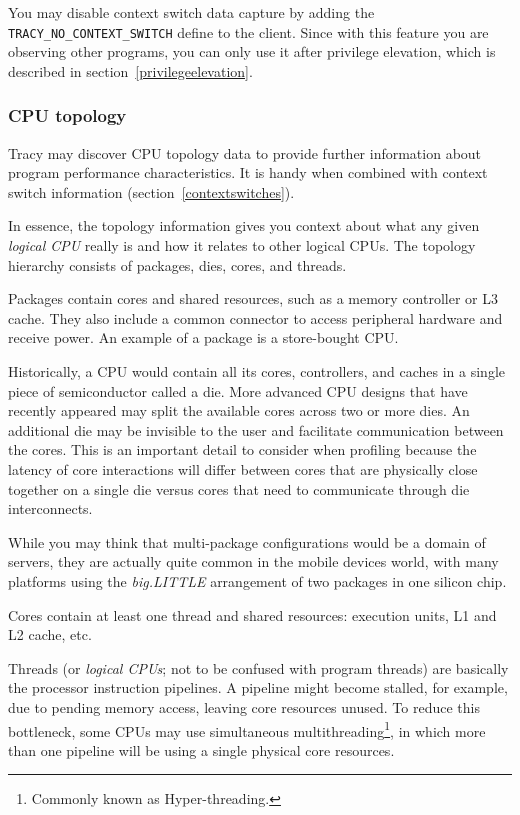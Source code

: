\documentclass[hidelinks,titlepage,a4paper,twoside]{article}
\begin{document}
You may disable context switch data capture by adding the \texttt{TRACY\_NO\_CONTEXT\_SWITCH} define to the client. Since with this feature you are observing other programs, you can only use it after privilege elevation, which is described in section~\ref{privilegeelevation}.

\subsubsection{CPU topology}
\label{cputopology}

Tracy may discover CPU topology data to provide further information about program performance characteristics. It is handy when combined with context switch information (section~\ref{contextswitches}).

In essence, the topology information gives you context about what any given \emph{logical CPU} really is and how it relates to other logical CPUs. The topology hierarchy consists of packages, dies, cores, and threads.

Packages contain cores and shared resources, such as a memory controller or L3 cache. They also include a common connector to access peripheral hardware and receive power. An example of a package is a store-bought CPU.

Historically, a CPU would contain all its cores, controllers, and caches in a single piece of semiconductor called a die. More advanced CPU designs that have recently appeared may split the available cores across two or more dies. An additional die may be invisible to the user and facilitate communication between the cores. This is an important detail to consider when profiling because the latency of core interactions will differ between cores that are physically close together on a single die versus cores that need to communicate through die interconnects.

While you may think that multi-package configurations would be a domain of servers, they are actually quite common in the mobile devices world, with many platforms using the \emph{big.LITTLE} arrangement of two packages in one silicon chip.

Cores contain at least one thread and shared resources: execution units, L1 and L2 cache, etc.

Threads (or \emph{logical CPUs}; not to be confused with program threads) are basically the processor instruction pipelines. A pipeline might become stalled, for example, due to pending memory access, leaving core resources unused. To reduce this bottleneck, some CPUs may use simultaneous multithreading\footnote{Commonly known as Hyper-threading.}, in which more than one pipeline will be using a single physical core resources.
\end{document}
